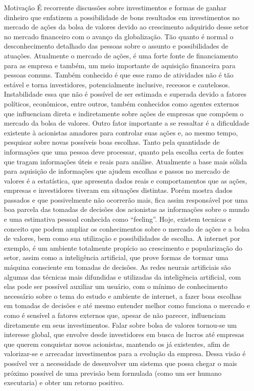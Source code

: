 \documentclass[brazil,twocolumn]{svjour3}
\begin{document}
Motivação
É recorrente discussões sobre investimentos e formas de ganhar dinheiro que enfatizem a possibilidade de bons resultados em investimentos no mercado de ações da bolsa de valores devido ao crescimento adquirido desse setor no mercado financeiro com o avanço da globalização. Tão quanto é normal o desconhecimento detalhado das pessoas sobre o assunto e possibilidades de atuações. Atualmente o mercado de ações, é uma forte fonte de financiamento para as empresa e também, um meio importante de aquisição financeira para pessoas comuns.
Também conhecido é que esse ramo de atividades não é tão estável e torna investidores, potencialmente inclusive, receosos e cautelosos. Instabilidade essa que não é possível de ser estimada e superada devido a fatores políticos, econômicos, entre outros, também conhecidos como agentes externos que influenciam direta e indiretamente sobre ações de empresas que compõem o mercado da bolsa de valores.
Outro fator importante a se ressaltar é a dificuldade existente à acionistas amadores para controlar suas ações e, ao mesmo tempo, pesquisar sobre novas possíveis boas escolhas. Tanto pela quantidade de informações que uma pessoa deve processar, quanto pela escolha certa de fontes que tragam informações úteis e reais para análise.
Atualmente a base mais sólida para aquisição de informações que ajudem escolhas e passos no mercado de valores é a estatística, que apresenta dados reais e comportamentos que as ações, empresas e investidores tiveram em situações distintas. Porém mostra dados passados e que possivelmente não ocorrerão mais, fica assim responsável por uma boa parcela das tomadas de decisões dos acionistas as informações sobre o mundo e uma estimativa pessoal conhecida como “feeling”.
Hoje, existem tecnicas e conceito que podem ampliar os conhecimentos sobre o mercado de ações e a bolsa de valores, bem como sua utilização e possibilidades de escolha. A internet por exemplo, é um ambiente totalmente propício ao crescimento e popularização do setor, assim como a inteligência artificial, que prove formas de tormar uma máquina consciente em tomadas de decisões. 
As redes neurais artificiais são algumas das técnicas mais difundidas e utilizadas da inteligência artificial, com elas pode ser possível auxiliar um usuário, com o mínimo de conhecimento necessário sobre o tema do estudo e ambiente de internet, a fazer boas escolhas em tomadas de decisões e até mesmo entender melhor como funciona o mercado e como é sensível a fatores externos que, apesar de não parecer, influenciam diretamente em seus investimentos.
Falar sobre bolsa de valores tornou-se um interesse global, que envolve desde investidores em busca de lucros até empresas que querem conquistar novos acionistas, mantendo os já existentes, afim de valorizar-se e arrecadar investimentos para a evolução da empresa. Dessa visão é possível ver a necessidade de desenvolver um sistema que possa chegar o mais próximo possível de uma previsão bem formulada (como um ser humano executaria) e obter um retorno positivo.
\end{document}
